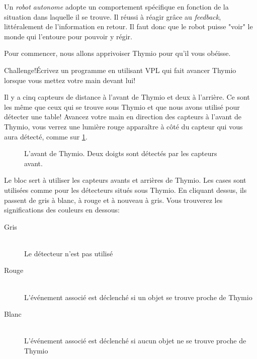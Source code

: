 \label{ch.pet}

Un \textit{robot autonome} adopte un comportement spécifique en fonction de la situation dans laquelle il se trouve. Il réussi à réagir grâce au \textit{feedback}, littéralement de l'information en retour. Il faut donc que le robot puisse "voir" le monde qui l'entoure pour pouvoir y régir.


Pour commencer, nous allons apprivoiser Thymio pour qu'il vous obéisse. 

\begin{bclogo}[couleur = pink!30, arrondi = 0.1, logo = \bccrayon, ombre = true]{Challenge!}Écrivez un programme en utilisant VPL qui fait avancer Thymio lorsque vous mettez votre main devant lui!
\end{bclogo}

Il y a cinq capteurs de distance à l'avant de Thymio et deux à l'arrière. Ce sont les même que ceux qui se trouve sous Thymio et que nous avons utilisé pour détecter une table! Avancez votre main en direction des capteurs à l'avant de Thymio, vous verrez une lumière rouge apparaître à côté du capteur qui vous aura détecté, comme sur \cref{fig.detect}.

\begin{figure}
\begin{center}
\caption{L'avant de Thymio. Deux doigts sont détectés par les capteurs avant.}\label{fig.detect}
\end{center}
\end{figure}

Le bloc  sert à utiliser les capteurs avants et arrières de Thymio. Les cases sont utilisées comme pour les détecteurs situés sous Thymio. En cliquant dessus, ils passent de gris à blanc, à rouge et à nouveau à gris. Vous trouverez les significations des couleurs en dessous:

\begin{description}
	\item[Gris] \hfill \\
		Le détecteur n'est pas utilisé
	\item[Rouge] \hfill \\
		L'événement associé est déclenché si un objet se trouve proche de Thymio
	\item[Blanc] \hfill \\
		L'événement associé est déclenché si aucun objet ne se trouve proche de Thymio
\end{description}

